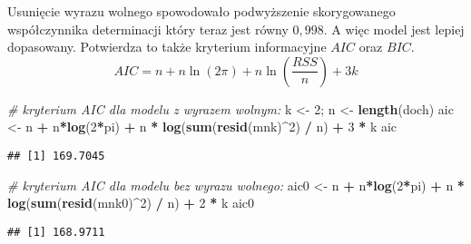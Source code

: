 \documentclass[polish,]{book}
\newenvironment{Shaded}{\begin{snugshade}}{\end{snugshade}}
\newcommand{\CommentTok}[1]{\textcolor[rgb]{0.56,0.35,0.01}{\textit{#1}}}
\newcommand{\DecValTok}[1]{\textcolor[rgb]{0.00,0.00,0.81}{#1}}
\newcommand{\KeywordTok}[1]{\textcolor[rgb]{0.13,0.29,0.53}{\textbf{#1}}}
\newcommand{\NormalTok}[1]{#1}
\newcommand{\OperatorTok}[1]{\textcolor[rgb]{0.81,0.36,0.00}{\textbf{#1}}}
\newcommand{\StringTok}[1]{\textcolor[rgb]{0.31,0.60,0.02}{#1}}
\begin{document}
Usunięcie wyrazu wolnego spowodowało podwyższenie skorygowanego współczynnika determinacji który teraz jest równy \(0,998\). A więc model jest lepiej dopasowany.
Potwierdza to także kryterium informacyjne \(AIC\) oraz \(BIC\).
\begin{equation}
AIC=n+n\ln(2\pi)+n\ln\left(\frac{RSS}{n}\right)+3k
\label{eq:wz132}
\end{equation}

\begin{Shaded}
\begin{Highlighting}[]
\CommentTok{# kryterium AIC dla modelu z wyrazem wolnym:}
\NormalTok{k <-}\StringTok{ }\DecValTok{2}\NormalTok{; n <-}\StringTok{ }\KeywordTok{length}\NormalTok{(doch)}
\NormalTok{aic <-}\StringTok{ }\NormalTok{n }\OperatorTok{+}\StringTok{ }\NormalTok{n}\OperatorTok{*}\KeywordTok{log}\NormalTok{(}\DecValTok{2}\OperatorTok{*}\NormalTok{pi) }\OperatorTok{+}\StringTok{ }\NormalTok{n }\OperatorTok{*}\StringTok{ }\KeywordTok{log}\NormalTok{(}\KeywordTok{sum}\NormalTok{(}\KeywordTok{resid}\NormalTok{(mnk)}\OperatorTok{^}\DecValTok{2}\NormalTok{) }\OperatorTok{/}\StringTok{ }\NormalTok{n) }\OperatorTok{+}\StringTok{ }\DecValTok{3} \OperatorTok{*}\StringTok{ }\NormalTok{k}
\NormalTok{aic}
\end{Highlighting}
\end{Shaded}

\begin{verbatim}
## [1] 169.7045
\end{verbatim}

\begin{Shaded}
\begin{Highlighting}[]
\CommentTok{# kryterium AIC dla modelu bez wyrazu wolnego:}
\NormalTok{aic0 <-}\StringTok{ }\NormalTok{n }\OperatorTok{+}\StringTok{ }\NormalTok{n}\OperatorTok{*}\KeywordTok{log}\NormalTok{(}\DecValTok{2}\OperatorTok{*}\NormalTok{pi) }\OperatorTok{+}\StringTok{ }\NormalTok{n }\OperatorTok{*}\StringTok{ }\KeywordTok{log}\NormalTok{(}\KeywordTok{sum}\NormalTok{(}\KeywordTok{resid}\NormalTok{(mnk0)}\OperatorTok{^}\DecValTok{2}\NormalTok{) }\OperatorTok{/}\StringTok{ }\NormalTok{n) }\OperatorTok{+}\StringTok{ }\DecValTok{2} \OperatorTok{*}\StringTok{ }\NormalTok{k}
\NormalTok{aic0}
\end{Highlighting}
\end{Shaded}

\begin{verbatim}
## [1] 168.9711
\end{verbatim}
\end{document}
